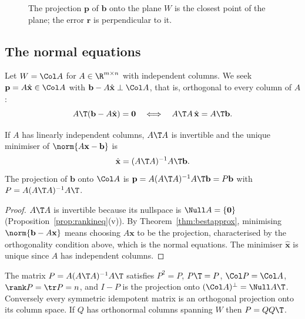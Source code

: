 \begin{figure}[h]
\centering
{}
\caption{The projection $\mathbf{p}$ of $\mathbf{b}$ onto the plane $W$ is the closest point of the plane; the error $\mathbf{r}$ is perpendicular to it.}
\end{figure}

\subsection*{The normal equations}

Let $W=\Col A$ for $A\in\R^{m\times n}$ with independent columns. We seek $\mathbf{p}=A\hat{\mathbf{x}}\in\Col A$ with $\mathbf{b}-A\hat{\mathbf{x}}\perp\Col A$, that is, orthogonal to every column of $A$:
\[ A\T(\mathbf{b}-A\hat{\mathbf{x}})=\mathbf{0}\quad\Longleftrightarrow\quad A\T A\,\hat{\mathbf{x}}=A\T\mathbf{b}. \]

\begin{theorem}\label{thm:normal}
If $A$ has linearly independent columns, $A\T A$ is invertible and the unique minimiser of $\norm{A\mathbf{x}-\mathbf{b}}$ is
\[ \hat{\mathbf{x}}=(A\T A)^{-1}A\T\mathbf{b}. \]
The projection of $\mathbf{b}$ onto $\Col A$ is $\mathbf{p}=A(A\T A)^{-1}A\T\mathbf{b}=P\mathbf{b}$ with $P=A(A\T A)^{-1}A\T$.
\end{theorem}

\begin{proof}
$A\T A$ is invertible because its nullspace is $\Null A=\{\mathbf{0}\}$ (Proposition~\ref{prop:rankineq}(v)). By Theorem~\ref{thm:bestapprox}, minimising $\norm{\mathbf{b}-A\mathbf{x}}$ means choosing $A\mathbf{x}$ to be the projection, characterised by the orthogonality condition above, which is the normal equations. The minimiser $\hat{\mathbf{x}}$ is unique since $A$ has independent columns.
\end{proof}

\begin{theorem}\label{thm:projmat}
The matrix $P=A(A\T A)^{-1}A\T$ satisfies $P^2=P$, $P\T=P$, $\Col P=\Col A$, $\rank P=\tr P=n$, and $I-P$ is the projection onto $(\Col A)^\perp=\Null A\T$. Conversely every symmetric idempotent matrix is an orthogonal projection onto its column space. If $Q$ has orthonormal columns spanning $W$ then $P=QQ\T$.
\end{theorem}

